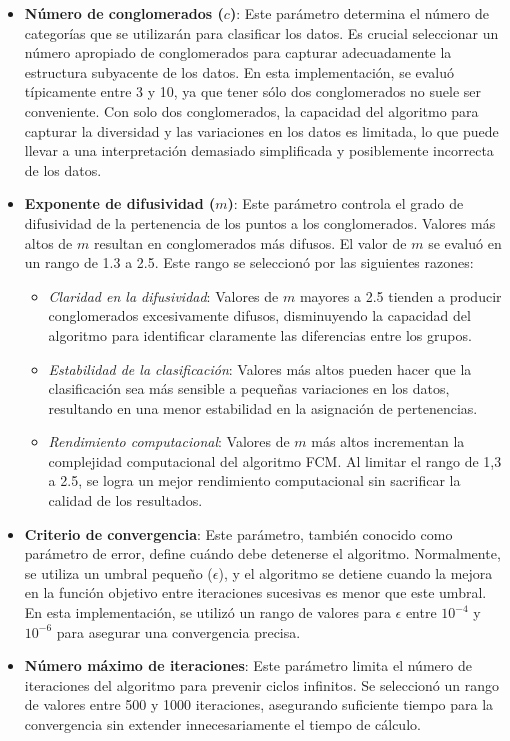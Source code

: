 \begin{itemize}
    \item \textbf{Número de conglomerados ($c$)}: Este parámetro determina el número de categorías que se utilizarán para clasificar los datos. Es crucial seleccionar un número apropiado de conglomerados para capturar adecuadamente la estructura subyacente de los datos. En esta implementación, se evaluó típicamente entre 3 y 10, ya que tener sólo dos conglomerados no suele ser conveniente. Con solo dos conglomerados, la capacidad del algoritmo para capturar la diversidad y las variaciones en los datos es limitada, lo que puede llevar a una interpretación demasiado simplificada y posiblemente incorrecta de los datos.
    \item \textbf{Exponente de difusividad ($m$)}: Este parámetro controla el grado de difusividad de la pertenencia de los puntos a los conglomerados. Valores más altos de $m$ resultan en conglomerados más difusos. El valor de $m$ se evaluó en un rango de 1.3 a 2.5. Este rango se seleccionó por las siguientes razones:
    \begin{itemize}
        \item \textit{Claridad en la difusividad}: Valores de $m$ mayores a 2.5 tienden a producir conglomerados excesivamente difusos, disminuyendo la capacidad del algoritmo para identificar claramente las diferencias entre los grupos.
        \item \textit{Estabilidad de la clasificación}: Valores más altos pueden hacer que la clasificación sea más sensible a pequeñas variaciones en los datos, resultando en una menor estabilidad en la asignación de pertenencias.
        \item \textit{Rendimiento computacional}: Valores de $m$ más altos incrementan la complejidad computacional del algoritmo FCM. Al limitar el rango de 1,3 a 2.5, se logra un mejor rendimiento computacional sin sacrificar la calidad de los resultados.
    \end{itemize}
    \item \textbf{Criterio de convergencia}: Este parámetro, también conocido como parámetro de error, define cuándo debe detenerse el algoritmo. Normalmente, se utiliza un umbral pequeño ($\epsilon$), y el algoritmo se detiene cuando la mejora en la función objetivo entre iteraciones sucesivas es menor que este umbral. En esta implementación, se utilizó un rango de valores para $\epsilon$ entre $10^{-4}$ y $10^{-6}$ para asegurar una convergencia precisa.
    \item \textbf{Número máximo de iteraciones}: Este parámetro limita el número de iteraciones del algoritmo para prevenir ciclos infinitos. Se seleccionó un rango de valores entre 500 y 1000 iteraciones, asegurando suficiente tiempo para la convergencia sin extender innecesariamente el tiempo de cálculo.
\end{itemize}

